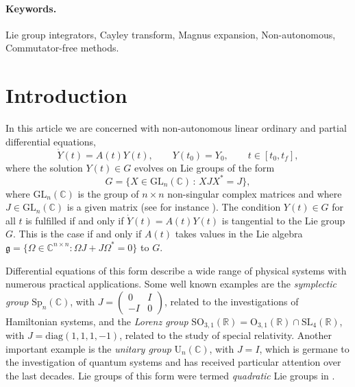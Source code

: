 \documentclass{article}
\newcommand{\R}{\mathbb{R}}
\newcommand{\C}{\mathbb{C}}
\begin{document}
\paragraph{Keywords.}
Lie group integrators, Cayley transform, Magnus expansion, Non-autonomous, Commutator-free methods.



\maketitle

\section{Introduction}
In this article we are concerned with non-autonomous linear ordinary and partial differential equations,
%
\begin{equation}
\label{eq:pb}
\dot{Y}(t) = A(t)Y(t), \qquad Y(t_0) = Y_0,  \qquad t \in [t_0, t_f], 
\end{equation}
where the solution $Y(t) \in G$ evolves on Lie groups of the form
\begin{equation}
\label{eq:Lie group}
G = \{X \in \mathrm{GL}_n(\C) \, : \, XJX^* = J\},
\end{equation}
where $\mathrm{GL}_n(\C)$ is the group of $n\times n$ non-singular complex matrices and where $J \in \mathrm{GL}_n(\C)$ is a given matrix (see for instance \cite{BC:2017, CCLMO2022, HLW:2006}). 
%
The condition $Y(t) \in G$ for all $t$ is fulfilled if and only if $\dot Y(t)=A(t)Y(t)$ is tangential to the Lie group $G$. This is the case if and only if $A(t)$ takes values in the Lie algebra $\mathfrak g = \{ \Omega \in \C^{n \times n} : \Omega J + J \Omega^\ast =0 \}$ to $G$.

Differential equations of this form describe a wide range of physical systems with numerous practical applications. Some well known examples are the \emph{symplectic group} $\mathrm{Sp}_n(\C)$, with $J = \begin{pmatrix}
0 & I \\
-I & 0
\end{pmatrix}$, related to the investigations of Hamiltonian systems, and the \emph{Lorenz group} $\mathrm{SO}_{3,1}(\R) = \mathrm{O}_{3,1}(\R) \cap \mathrm{SL}_4(\R)$, with $J = \mathrm{diag}(1,1,1,-1)$, related to the study of special relativity. 
%
Another important example is the \emph{unitary group} $\mathrm{U}_n(\C)$, with $J=I$, which is germane to the investigation of quantum systems and has received particular attention over the last decades. Lie groups of this form were termed {\em quadratic} Lie groups in \cite{Iserles:2001}. 
\end{document}
